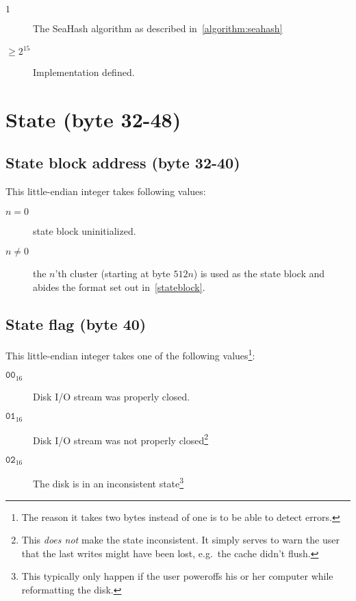 \documentclass[11pt,a4paper]{report}
\newcommand{\clustersize}{512 }
\begin{document}
        \begin{description}
            \item [$1$] The SeaHash algorithm as described
                in~\ref{algorithm:seahash}
            \item [$\geq 2^{15}$] Implementation defined.
        \end{description}

    \section{State (byte 32-48)}
        \subsection{State block address (byte 32-40)}
        \label{header:stateblock}
        This little-endian integer takes following values:

        \begin{description}
            \item [$n = 0$]    state block uninitialized.
            \item [$n \neq 0$] the $n$'th cluster (starting at byte
                $\clustersize n$) is used as the state block and abides the
                format set out in~\ref{stateblock}.
        \end{description}

        \subsection{State flag (byte 40)}
        \label{header:consistency}
        This little-endian integer takes one of the following
        values\footnote{The reason it takes two bytes instead of one is to be
        able to detect errors.}:

        \begin{description}
            \item [$\texttt{00}_{16}$] Disk I/O stream was properly closed.
            \item [$\texttt{01}_{16}$] Disk I/O stream was not properly
                closed\footnote{This \emph{does not} make the state
                inconsistent. It simply serves to warn the user that the last
                writes might have been lost, e.g.\ the cache didn't flush.}
            \item [$\texttt{02}_{16}$] The disk is in an inconsistent
                state\footnote{This typically only happen if the user poweroffs
                his or her computer while reformatting the disk.}
        \end{description}
\end{document}
